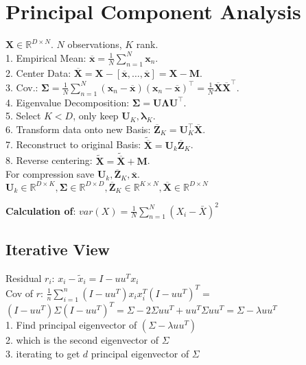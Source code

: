 \section{Principal Component Analysis}
$\mathbf{X} \in \mathbb{R}^{D \times N}$. $N$ observations, $K$ rank.\\
1. Empirical Mean: $\overline{\mathbf{x}} = \frac{1}{N} \sum_{n=1}^N \mathbf{x}_n$.\\
2. Center Data: $\overline{\mathbf{X}} = \mathbf{X} - [\overline{\mathbf{x}}, \ldots, \overline{\mathbf{x}}] = \mathbf{X} - \mathbf{M}$.\\
3. Cov.: $\boldsymbol{\Sigma} = \frac{1}{N	} \sum_{n=1}^N (\mathbf{x}_n - \overline{\mathbf{x}}) (\mathbf{x}_n - \overline{\mathbf{x}})^\top = \frac{1}{N} \overline{\mathbf{X}}\overline{\mathbf{X}}^\top$.\\
4. Eigenvalue Decomposition: $\boldsymbol{\Sigma} = \mathbf{U} \boldsymbol{\Lambda} \mathbf{U}^\top$.\\
5. Select $K < D$, only keep $\mathbf{U}_K, \boldsymbol{\lambda}_K$.\\
6. Transform data onto new Basis: $\overline{\mathbf{Z}}_K = \mathbf{U}_K^\top \overline{\mathbf{X}}$.\\
7. Reconstruct to original Basis: $\tilde{\overline{\mathbf{X}}} = \mathbf{U}_k \overline{\mathbf{Z}}_K$.\\
8. Reverse centering: $\tilde{\mathbf{X}} = \tilde{\overline{\mathbf{X}}} + \mathbf{M}$.\\
For compression save $\mathbf{U}_k, \overline{\mathbf{Z}}_K, \overline{\mathbf{x}}$.\\
$\mathbf{U}_k \in \mathbb{R}^{D \times K}, \boldsymbol{\Sigma} \in \mathbb{R}^{D \times D}, \overline{\mathbf{Z}}_K \in \mathbb{R}^{K \times N}, \overline{\mathbf{X}} \in \mathbb{R}^{D \times N}$

\textbf{Calculation of}: $var(X) = \frac{1}{N} \sum_{n=1}^N (X_i - \bar{X})^2$

\subsection*{Iterative View}
Residual $r_i$: $x_i - \tilde{x}_i = I - uu^T  x_i$\\
Cov of $r$:  $\frac{1}{n} \sum_{i=1}^n (I-uu^T)x_i x_i^T (I-uu^T)^T =$ \\
$(I-uu^T) \Sigma (I-uu^T)^T = \Sigma - 2\Sigma u u^T + u u^T \Sigma u u ^T = \Sigma - \lambda uu^T$ \\
1. Find principal eigenvector of $(\Sigma - \lambda u u^T)$\\
2. which is the second eigenvector of $\Sigma$\\
3. iterating to get $d$ principal eigenvector of $\Sigma$


